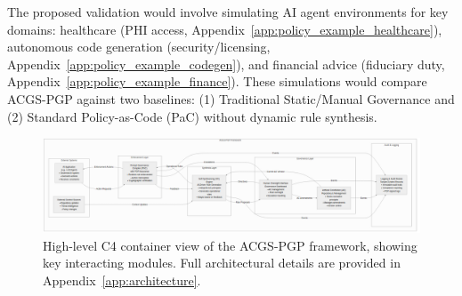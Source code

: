 \documentclass[sigconf,review,anonymous=false]{acmart} %
\begin{document}
The proposed validation would involve simulating AI agent environments for key domains: healthcare (PHI access, Appendix~\ref{app:policy_example_healthcare}), autonomous code generation (security/licensing, Appendix~\ref{app:policy_example_codegen}), and financial advice (fiduciary duty, Appendix~\ref{app:policy_example_finance}). These simulations would compare ACGS-PGP against two baselines: (1) Traditional Static/Manual Governance and (2) Standard Policy-as-Code (PaC) without dynamic rule synthesis.

\begin{figure}[t]
  \centering
  \includegraphics[width=0.9\columnwidth]{figures/figure1_c4_architecture.png}
  \caption{High-level C4 container view of the ACGS-PGP framework, showing key interacting modules. Full architectural details are provided in Appendix~\ref{app:architecture}.}
  \label{fig:c4_architecture}
\end{figure}
\end{document}
